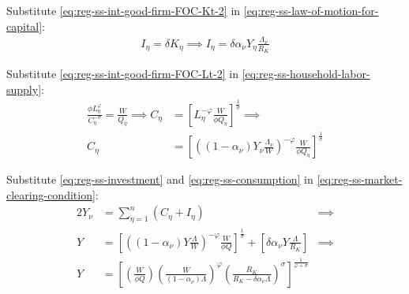 \documentclass[
thesis.tex
]{subfiles}
\begin{document}
	
	Substitute \ref{eq:reg-ss-int-good-firm-FOC-Kt-2} in \ref{eq:reg-ss-law-of-motion-for-capital}:
	\begin{align}
		I_{\eta} = \delta K_{\eta} \implies I_{\eta} = \delta {\alpha_\nu} Y_{\eta} \frac{\Lambda_{\nu}}{R_K} \label{eq:reg-ss-investment}
	\end{align}

	Substitute \ref{eq:reg-ss-int-good-firm-FOC-Lt-2} in \ref{eq:reg-ss-household-labor-supply}:
	\begin{align}
		\frac{\phi L_{\eta}^{\varphi}}{C_{\eta}^{-\sigma}} = \frac{W}{Q_{\eta}} \implies C_{\eta} &= \left[ L_{\eta}^{-\varphi} \frac{W}{\phi Q_{\eta}} \right]^{\frac{1}{\sigma}} \implies \nonumber\\
		C_{\eta} &= \left[ \left( (1-{\alpha_\nu}) Y_{\nu} \frac{\Lambda_{\nu}}{W} \right)^{-\varphi} \frac{W}{\phi Q_{\eta}} \right]^{\frac{1}{\sigma}} \label{eq:reg-ss-consumption}
	\end{align}

	Substitute \ref{eq:reg-ss-investment} and \ref{eq:reg-ss-consumption} in \ref{eq:reg-ss-market-clearing-condition}:
	\begin{alignat}{2}
		Y_{\nu} &= \sum_{\eta=1}^{n} (C_{\eta} + I_{\eta}) &\implies \nonumber \\
		Y &= \left[ \left( (1-{\alpha_\nu}) Y \frac{\Lambda}{W} \right)^{-\varphi} \frac{W}{\phi Q} \right]^{\frac{1}{\sigma}} + \left[ \delta {\alpha_\nu} Y \frac{\Lambda}{R_K} \right] &\implies \nonumber \\
		Y &=\left[
		\left( \frac{W}{\phi Q}                \right)
		\left( \frac{W}{(1-{\alpha_\nu})\Lambda}     \right)^\varphi
		\left( \frac{R_K}{R_K-\delta{\alpha_\nu}\Lambda} \right)^\sigma
		\right]^\frac{1}{\varphi+\sigma} & \label{eq:reg-ss-production}
	\end{alignat}
\end{document}
